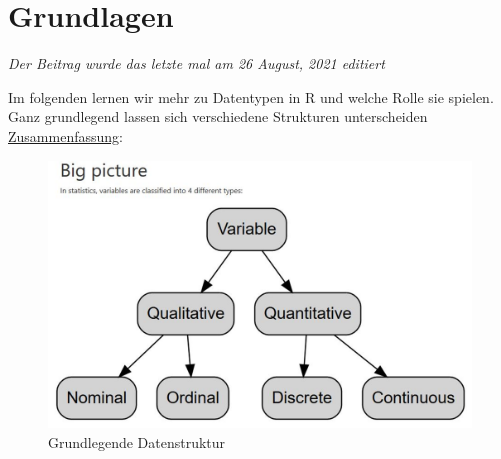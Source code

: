 \documentclass[
]{article}
\begin{document}
\hypertarget{grundlagen}{%
\section{Grundlagen}\label{grundlagen}}

\emph{Der Beitrag wurde das letzte mal am 26 August, 2021 editiert}

Im folgenden lernen wir mehr zu Datentypen in R und welche Rolle sie spielen. Ganz grundlegend lassen sich verschiedene Strukturen unterscheiden \href{https://statsandr.com/blog/variable-types-and-examples/}{Zusammenfassung}:

\begin{figure}

{\centering \includegraphics[width=1\linewidth]{images/013a} 

}

\caption{Grundlegende Datenstruktur}\label{fig:unnamed-chunk-38}
\end{figure}
\end{document}
